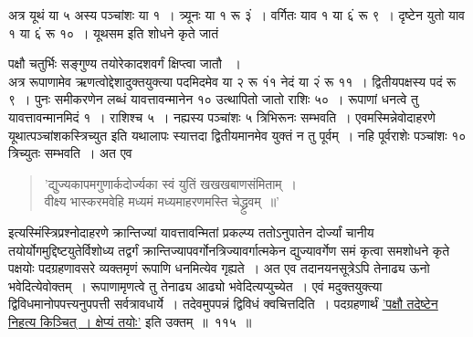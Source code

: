 \documentclass[11pt, openany]{book}
\begin{document}
\begin{sloppypar}
अत्र यूथं या ५ अस्य पञ्चांशः या १~। त्र्यूनः या १ रू ३ं~। वर्गितः याव १ या ६ं रू ९~। दृष्टेन युतो याव १ या ६ं रू १०~। यूथसम इति शोधने कृते जातं 

\end{sloppypar}

\newpage

\begin{sloppypar}
\noindent पक्षौ चतुर्भिः सङ्गुण्य तयोरेकादशवर्गं क्षिप्त्वा जातौ ~।\\

अत्र रूपाणामेव ऋणत्वोद्देशादुक्तयुक्त्या पदमिदमेव या २ रू १ं१ नेदं या २ं रू ११~। द्वितीयपक्षस्य पदं रू ९~। पुनः समीकरणेन लब्धं यावत्तावन्मानेन १० उत्थापितो जातो राशिः ५०~। रूपाणां धनत्वे तु यावत्तावन्मानमिदं १~। राशिश्च ५~। नह्यस्य पञ्चांशः ५ त्रिभिरूनः सम्भवति~। एवमस्मिन्नेवोदाहरणे यूथात्पञ्चांशकस्त्रिच्युत इति यथालापः स्यात्तदा द्वितीयमानमेव युक्तं न तु पूर्वम्~। नहि पूर्वराशेः पञ्चांशः १० त्रिच्युतः सम्भवति~। अत एव\textendash
\vspace{-1mm}

\begin{quote}
{\color{violet}'द्युज्यकापमगुणार्कदोर्ज्यका स्वं युतिं खखखबाणसंमिताम्~।\\
वीक्ष्य भास्करमवेहि मध्यमं मध्यमाहरणमस्ति चेद्ध्रुवम्~॥'}
\end{quote}
\vspace{-1mm}

इत्यस्मिंस्त्रिप्रश्नोदाहरणे क्रान्तिज्यां यावत्तावन्मितां प्रकल्प्य ततोऽनुपातेन दोर्ज्यां चानीय तयोर्योगमुद्दिष्टयुतेर्विशोध्य तद्वर्गं क्रान्तिज्यापवर्गोनत्रिज्यावर्गात्मकेन द्युज्यावर्गेण समं कृत्वा समशोधने कृते पक्षयोः पदग्रहणावसरे व्यक्तमृणं रूपाणि धनमित्येव गृह्यते~। अत एव तदानयनसूत्रेऽपि तेनाढ्य ऊनो भवेदित्येवोक्तम्~। रूपाणामृणत्वे तु तेनाढ्य आढ्यो भवेदित्यप्युच्येत~। एवं मदुक्तयुक्त्या द्विविधमानोपपत्त्यनुपपत्ती सर्वत्रावधार्ये~। तदेवमुपपन्नं द्विविधं क्वचित्तदिति~। पदग्रहणार्थं \hyperref[8.115]{'पक्षौ तदेष्टेन निहत्य किञ्चित्~। क्षेप्यं तयोः'} इति उक्तम्~॥~११५~॥\\


\end{sloppypar}
\end{document}
